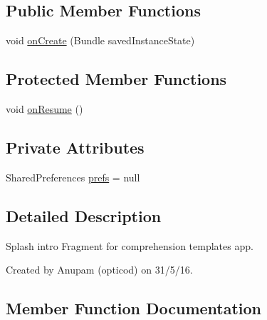 \subsection*{Public Member Functions}
\begin{DoxyCompactItemize}
\item 
void \hyperlink{classorg_1_1buildmlearn_1_1comprehension_1_1activities_1_1SplashActivity_afc6b880a4e15e5af2bdaf562aef6777b}{on\+Create} (Bundle saved\+Instance\+State)
\end{DoxyCompactItemize}
\subsection*{Protected Member Functions}
\begin{DoxyCompactItemize}
\item 
void \hyperlink{classorg_1_1buildmlearn_1_1comprehension_1_1activities_1_1SplashActivity_a6eb4f2e0eb1fc5bea656a8e093858c83}{on\+Resume} ()
\end{DoxyCompactItemize}
\subsection*{Private Attributes}
\begin{DoxyCompactItemize}
\item 
Shared\+Preferences \hyperlink{classorg_1_1buildmlearn_1_1comprehension_1_1activities_1_1SplashActivity_a13b22cb8b1e66096be07bdf32b8dfce3}{prefs} = null
\end{DoxyCompactItemize}


\subsection{Detailed Description}
Splash intro Fragment for comprehension template\textquotesingle{}s app. 

Created by Anupam (opticod) on 31/5/16. 

\subsection{Member Function Documentation}
